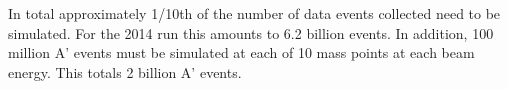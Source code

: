 %
%
In total approximately 1/10th of the number of data events collected need to be simulated. For the 2014 run this amounts to 6.2 billion events.
In addition, 100 million A' events must be simulated at each of 10 mass points at each beam energy. This totals 2 billion A' events.

